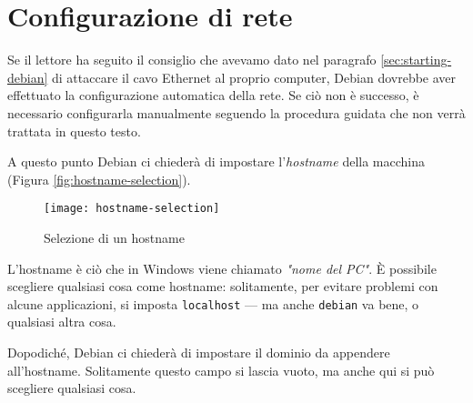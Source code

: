 \section{Configurazione di rete}
Se il lettore ha seguito il consiglio che avevamo dato nel paragrafo \vref{sec:starting-debian} di attaccare il cavo Ethernet al proprio computer, Debian dovrebbe aver effettuato la configurazione automatica della rete. Se ciò non è successo, è necessario configurarla manualmente seguendo la procedura guidata che non verrà trattata in questo testo.

A questo punto Debian ci chiederà di impostare l'\textit{hostname} della macchina (Figura \vref{fig:hostname-selection}).

\begin{figure}[ht]
	\centering
	\texttt{[image: hostname-selection]}
	\caption{Selezione di un hostname}
	\label{fig:hostname-selection}
\end{figure}

L'hostname è ciò che in Windows viene chiamato \textit{"nome del PC"}. È possibile scegliere qualsiasi cosa come hostname: solitamente, per evitare problemi con alcune applicazioni, si imposta \texttt{localhost} --- ma anche \texttt{debian} va bene, o qualsiasi altra cosa.

Dopodiché, Debian ci chiederà di impostare il dominio da appendere all'hostname. Solitamente questo campo si lascia vuoto, ma anche qui si può scegliere qualsiasi cosa.
